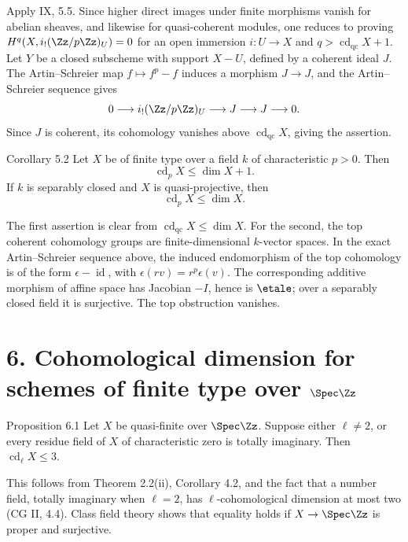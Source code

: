 \begin{prooftext}
Apply IX, 5.5. Since higher direct images under finite morphisms vanish for abelian sheaves, and likewise for quasi-coherent modules, one reduces to proving \(H^q(X,i_!(\Zz/p\Zz)_U)=0\) for an open immersion \(i:U\to X\) and \(q>\operatorname{cd}_{\mathrm{qc}}X+1\). Let \(Y\) be a closed subscheme with support \(X-U\), defined by a coherent ideal \(J\). The Artin--Schreier map \(f\mapsto f^p-f\) induces a morphism \(J\to J\), and the Artin--Schreier sequence gives
\[
0\longrightarrow i_!(\Zz/p\Zz)_U\longrightarrow J\longrightarrow J\longrightarrow0.
\]
Since \(J\) is coherent, its cohomology vanishes above \(\operatorname{cd}_{\mathrm{qc}}X\), giving the assertion.
\end{prooftext}

\begin{statement}{Corollary 5.2}
Let \(X\) be of finite type over a field \(k\) of characteristic \(p>0\). Then
\[
\operatorname{cd}_pX\leq \dim X+1.
\]
If \(k\) is separably closed and \(X\) is quasi-projective, then
\[
\operatorname{cd}_pX\leq \dim X.
\]
\end{statement}

The first assertion is clear from \(\operatorname{cd}_{\mathrm{qc}}X\leq\dim X\). For the second, the top coherent cohomology groups are finite-dimensional \(k\)-vector spaces. In the exact Artin--Schreier sequence above, the induced endomorphism of the top cohomology is of the form \(\epsilon-\operatorname{id}\), with \(\epsilon(rv)=r^p\epsilon(v)\). The corresponding additive morphism of affine space has Jacobian \(-I\), hence is \(\etale\); over a separably closed field it is surjective. The top obstruction vanishes.

\section*{6. Cohomological dimension for schemes of finite type over \(\Spec\Zz\)}

\begin{statement}{Proposition 6.1}
Let \(X\) be quasi-finite over \(\Spec\Zz\). Suppose either \(\ell\ne2\), or every residue field of \(X\) of characteristic zero is totally imaginary. Then \(\operatorname{cd}_\ell X\leq3\).
\end{statement}

This follows from Theorem 2.2(ii), Corollary 4.2, and the fact that a number field, totally imaginary when \(\ell=2\), has \(\ell\)-cohomological dimension at most two (CG II, 4.4). Class field theory shows that equality holds if \(X\to\Spec\Zz\) is proper and surjective.

